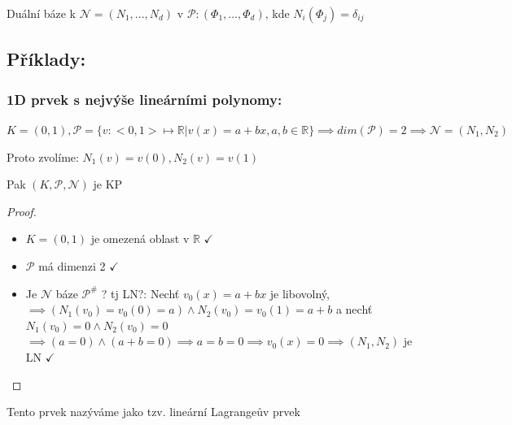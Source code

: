 \documentclass[../main.tex]{subfiles}
\begin{document}
Duální báze k $\mathcal{N} = (N_1, ... , N_d) \text{ v } \mathcal{P}: (\Phi_1, ..., \Phi_d)$, kde $N_i(\Phi_j) = \delta_{ij}$

\subsection{Příklady:}

\subsubsection{1D prvek s nejvýše lineárními polynomy:}
$K = (0,1), \mathcal{P} = \{  v: <0,1> \mapsto \mathbb{R} | v(x) = a + bx, a,b \in \mathbb{R}       \} \implies dim(\mathcal{P}) = 2 \implies \mathcal{N} = (N_1, N_2)$

Proto zvolíme: $N_1(v) = v(0), N_2(v) = v(1)$

\begin{lemma}
    Pak $(K, \mathcal{P}, \mathcal{N})$ je KP
\end{lemma}
\begin{proof}
    \begin{itemize}
        \item $K = (0,1)$ je omezená oblast v $\mathbb{R}$ $\checkmark$
        \item $\mathcal{P}$ má dimenzi 2 $\checkmark$
        \item Je $\mathcal{N}$ báze $\mathcal{P}^\#$ ? tj LN?: \hfill \break
            Nechť $v_0(x) = a+bx$ je libovolný, $\implies (N_1(v_0) = v_0(0) = a) \wedge N_2(v_0) = v_0(1) = a + b$ a nechť $N_1(v_0) = 0 \wedge N_2(v_0) = 0$  \hfill \break
            $\implies (a=0) \wedge (a+b = 0) \implies a=b=0 \implies v_0(x) = 0 \implies (N_1, N_2)$ je LN $\checkmark$

    \end{itemize}        
\end{proof}
\begin{definition}
    Tento prvek nazýváme jako tzv. lineární Lagrangeův prvek
\end{definition}
\end{document}
